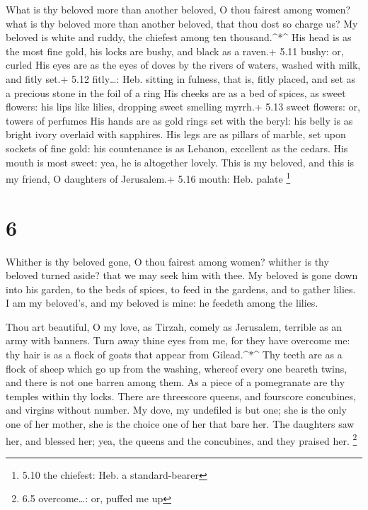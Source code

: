  What is thy beloved more than another beloved, O thou
fairest among women? what is thy beloved more than another beloved, that
thou dost so charge us?  My beloved is white and ruddy, the
chiefest among ten thousand.\^{}*\^{}  His head is as the
most fine gold, his locks are bushy, and black as a raven.+ 5.11 bushy:
or, curled  His eyes are as the eyes of doves by the rivers
of waters, washed with milk, and fitly set.+ 5.12 fitly\ldots: Heb.
sitting in fulness, that is, fitly placed, and set as a precious stone
in the foil of a ring  His cheeks are as a bed of spices,
as sweet flowers: his lips like lilies, dropping sweet smelling myrrh.+
5.13 sweet flowers: or, towers of perfumes  His hands are
as gold rings set with the beryl: his belly is as bright ivory overlaid
with sapphires.  His legs are as pillars of marble, set
upon sockets of fine gold: his countenance is as Lebanon, excellent as
the cedars.  His mouth is most sweet: yea, he is altogether
lovely. This is my beloved, and this is my friend, O daughters of
Jerusalem.+ 5.16 mouth: Heb. palate \footnote{5.10 the chiefest: Heb. a
  standard-bearer}

\hypertarget{section-5}{%
\section{6}\label{section-5}}

 Whither is thy beloved gone, O thou fairest among women?
whither is thy beloved turned aside? that we may seek him with thee.
 My beloved is gone down into his garden, to the beds of
spices, to feed in the gardens, and to gather lilies.  I am
my beloved's, and my beloved is mine: he feedeth among the lilies.

 Thou art beautiful, O my love, as Tirzah, comely as
Jerusalem, terrible as an army with banners.  Turn away
thine eyes from me, for they have overcome me: thy hair is as a flock of
goats that appear from Gilead.\^{}*\^{}  Thy teeth are as a
flock of sheep which go up from the washing, whereof every one beareth
twins, and there is not one barren among them.  As a piece
of a pomegranate are thy temples within thy locks.  There
are threescore queens, and fourscore concubines, and virgins without
number.  My dove, my undefiled is but one; she is the only
one of her mother, she is the choice one of her that bare her. The
daughters saw her, and blessed her; yea, the queens and the concubines,
and they praised her. \footnote{6.5 overcome\ldots: or, puffed me up}

